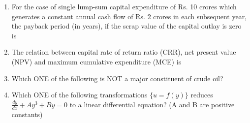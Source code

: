 \documentclass[journal,12pt,onecolumn]{IEEEtran}
\theoremstyle{remark}
\begin{document}
\begin{enumerate}
    \item For the case of single lump-sum capital expenditure of Rs. 10 crores which generates a constant annual cash flow of Rs. 2 crores in each subsequent year, the payback period (in years), if the scrap value of the capital outlay is zero is
    \hfill{}
    \begin{enumerate}[label=(\Alph*)]
    \end{enumerate}

    \item The relation between capital rate of return ratio (CRR), net present value (NPV) and maximum cumulative expenditure (MCE) is
    \hfill{}
    \begin{enumerate}[label=(\Alph*)]
    \end{enumerate}

    \item Which ONE of the following is NOT a major constituent of crude oil?
    \hfill{}
    \begin{enumerate}[label=(\Alph*)]
    \end{enumerate}

   \item Which ONE of the following transformations $\{ u = f(y) \}$ reduces $\frac{dy}{dx} + Ay^3 + By = 0$ to a linear differential equation? \quad (A and B are positive constants)
   \hfill{}
\begin{enumerate}
\end{enumerate}


\end{enumerate}
\end{document}
